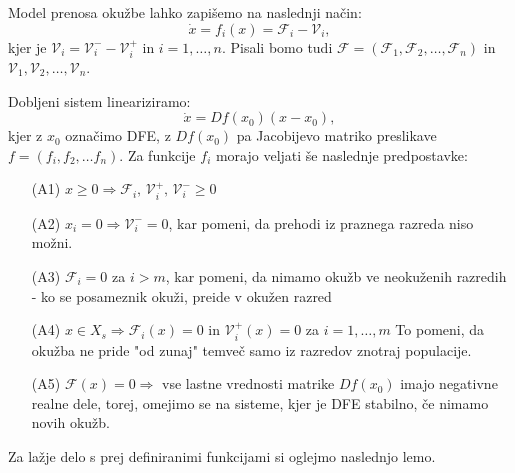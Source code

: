 \documentclass[a4paper,12pt]{article}
\newcommand{\todo}[1]{{\color{red}{#1}}}
\newcommand{\F}{\mathcal F}
\newcommand{\V}{\mathcal V}
\begin{document}
Model prenosa okužbe lahko zapišemo na naslednji način:
\begin{equation} \label{eq1}
\dot{x}=f_i(x)=\F_i - \V_i,
\end{equation}
kjer je \(\V_i=\V_i^- - \V_i^+\) in \(i=1,\ldots,n\). 
Pisali bomo tudi \(\F=(\F_1,\F_2,\ldots,\F_n)\) in \(\V_1,\V_2,\ldots,\V_n\).

Dobljeni sistem lineariziramo:
\begin{equation} \label{eq2}
\dot{x}=Df(x_0)(x-x_0),
\end{equation}
kjer z \(x_0\) označimo DFE, z \(Df(x_0)\) pa Jacobijevo matriko preslikave 
\(f=(f_i, f_2, \ldots f_n)\).
Za funkcije \(f_i\)
morajo veljati še naslednje predpostavke:

\begin{itemize}
    \item[(A1)] \(x\geq 0 \Rightarrow \F_i\textrm{, }\V_i^+\textrm{, }\V_i^- \geq 0\)
    \item[(A2)] \(x_i=0 \Rightarrow \V_i^- =0\), kar pomeni, da prehodi iz praznega 
    razreda niso možni. \todo{v posebnem} 
    \item[(A3)] \(\F_i=0\) za \(i>m\), kar pomeni, da nimamo okužb ve neokuženih razredih - 
    ko se posameznik okuži, preide v okužen razred 
    \item[(A4)] \(x\in X_s \Rightarrow \F_i(x)=0\) in \(\V_i^+(x)=0\) za \(i=1,\ldots,m\)
    To pomeni, da okužba ne pride "od zunaj" temveč samo iz razredov znotraj populacije. 
    \item[(A5)] \(\F(x)=0 \Rightarrow\) vse lastne vrednosti matrike \(Df(x_0)\) imajo 
    negativne realne dele, torej, omejimo se na sisteme, kjer je DFE stabilno, če nimamo novih okužb.    
\end{itemize}

Za lažje delo s prej definiranimi funkcijami si oglejmo naslednjo lemo.
\end{document}
